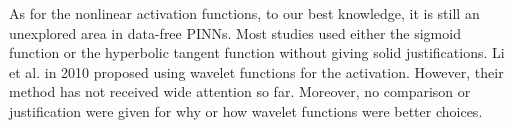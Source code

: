 As for the nonlinear activation functions, to our best knowledge, it is still an unexplored area in data-free PINNs.
Most studies used either the sigmoid function or the hyperbolic tangent function without giving solid justifications.
Li et al. \cite{li_integration_2010} in 2010 proposed using wavelet functions for the activation.
However, their method has not received wide attention so far.
Moreover, no comparison or justification were given for why or how wavelet functions were better choices.
